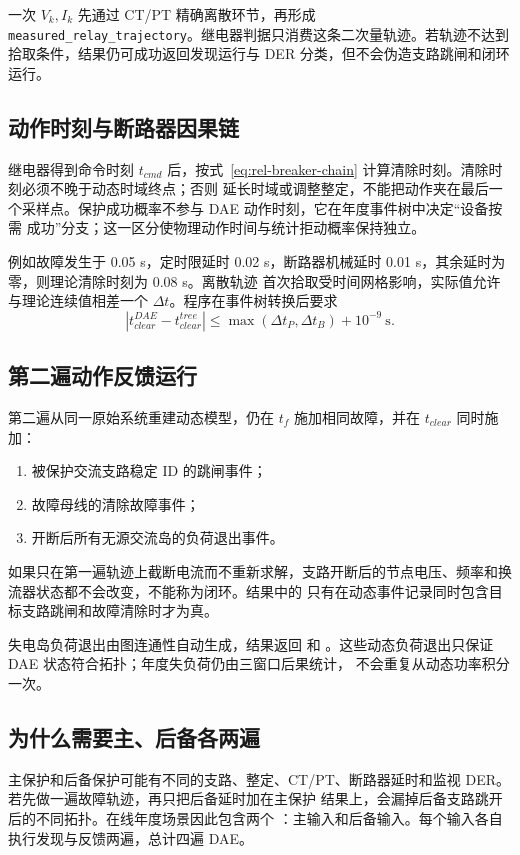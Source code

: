 一次 $V_k,I_k$ 先通过 CT/PT 精确离散环节，再形成
\verb|measured_relay_trajectory|。继电器判据只消费这条二次量轨迹。若轨迹不达到拾取条件，结果仍可成功返回发现运行与 DER
分类，但不会伪造支路跳闸和闭环运行。

\subsection{动作时刻与断路器因果链}
继电器得到命令时刻 $t_{cmd}$ 后，按式~\eqref{eq:rel-breaker-chain} 计算清除时刻。清除时刻必须不晚于动态时域终点；否则
延长时域或调整整定，不能把动作夹在最后一个采样点。保护成功概率不参与 DAE 动作时刻，它在年度事件树中决定“设备按需
成功”分支；这一区分使物理动作时间与统计拒动概率保持独立。

例如故障发生于 0.05 s，定时限延时 0.02 s，断路器机械延时 0.01 s，其余延时为零，则理论清除时刻为 0.08 s。离散轨迹
首次拾取受时间网格影响，实际值允许与理论连续值相差一个 $\Delta t$。程序在事件树转换后要求
\begin{equation}\label{eq:rel-dae-event-time-consistency}
 |t_{clear}^{DAE}-t_{clear}^{tree}|\le
 \max(\Delta t_P,\Delta t_B)+10^{-9}\ \mathrm{s}.
\end{equation}

\subsection{第二遍动作反馈运行}
第二遍从同一原始系统重建动态模型，仍在 $t_f$ 施加相同故障，并在 $t_{clear}$ 同时施加：
\begin{enumerate}
 \item 被保护交流支路稳定 ID 的跳闸事件；
 \item 故障母线的清除故障事件；
 \item 开断后所有无源交流岛的负荷退出事件。
\end{enumerate}
如果只在第一遍轨迹上截断电流而不重新求解，支路开断后的节点电压、频率和换流器状态都不会改变，不能称为闭环。结果中的
 只有在动态事件记录同时包含目标支路跳闸和故障清除时才为真。

失电岛负荷退出由图连通性自动生成，结果返回
 和
。这些动态负荷退出只保证 DAE 状态符合拓扑；年度失负荷仍由三窗口后果统计，
不会重复从动态功率积分一次。

\subsection{为什么需要主、后备各两遍}
主保护和后备保护可能有不同的支路、整定、CT/PT、断路器延时和监视 DER。若先做一遍故障轨迹，再只把后备延时加在主保护
结果上，会漏掉后备支路跳开后的不同拓扑。在线年度场景因此包含两个
：主输入和后备输入。每个输入各自执行发现与反馈两遍，总计四遍 DAE。

